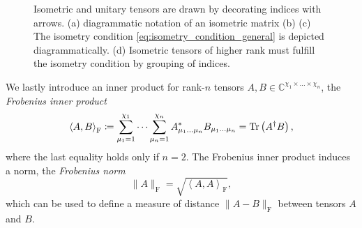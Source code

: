 \begin{figure}
\begin{minipage}[b]{0.4\textwidth}
{		}
	\end{minipage}
	\caption{Isometric and unitary tensors are drawn by decorating indices with arrows. (a) diagrammatic notation of an isometric matrix (b) (c) The isometry condition \eqref{eq:isometry_condition_general} is depicted diagrammatically. (d) Isometric tensors of higher rank must fulfill the isometry condition by grouping of indices.}
	\label{fig:isometries_and_unitaries_diagrams}
\end{figure}
We lastly introduce an inner product for rank-$n$ tensors $A, B \in \mathbb{C}^{\chi_1\times\dots\times\chi_n}$, the \textit{Frobenius inner product}
\begin{equation}
	\label{eq:frobenius_inner_product}
	\left\langle A, B\right\rangle_\text{F} \coloneqq \sum_{\mu_1=1}^{\chi_1} \dots \sum_{\mu_n=1}^{\chi_n} A_{\mu_1\dots\mu_n}^*B_{\mu_1\dots\mu_n} = \operatorname{Tr}\left(A^\dagger B\right),
\end{equation}
where the last equality holds only if $n = 2$. The Frobenius inner product induces a norm, the \textit{Frobenius norm}
\begin{equation}
	\label{eq:frobenius_norm}
	\lVert A\rVert_\text{F} = \sqrt{\left\langle A, A\right\rangle_\text{F}},
\end{equation}
which can be used to define a measure of distance $\lVert A-B\rVert_\text{F}$ between tensors $A$ and $B$.